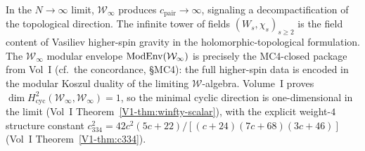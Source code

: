 \begin{remark}
In the $N \to \infty$ limit, $\mathcal{W}_\infty$ produces
$c_{\mathrm{pair}} \to \infty$, signaling a decompactification of the
topological direction. The infinite tower of fields
$(W_s, \chi_s)_{s \geq 2}$ is the field content of Vasiliev
higher-spin gravity in the holomorphic-topological formulation. The
$\mathcal{W}_\infty$ modular envelope $\operatorname{ModEnv}(\mathcal{W}_\infty)$ is
precisely the MC4-closed package from Vol~I
\textup{(}cf.~the concordance, \S\textup{MC4}\textup{)}: the full higher-spin
data is encoded in the modular Koszul duality of the limiting
$\mathcal{W}$-algebra.
Volume~I proves
$\dim H^2_{\mathrm{cyc}}(\mathcal{W}_\infty, \mathcal{W}_\infty)=1$,
so the minimal cyclic direction is one-dimensional in the limit
\textup{(}Vol~I Theorem~\ref*{V1-thm:winfty-scalar}\textup{)},
with the explicit weight-$4$ structure constant
$c_{334}^2 = 42c^2(5c+22)/[(c+24)(7c+68)(3c+46)]$
\textup{(}Vol~I Theorem~\ref*{V1-thm:c334}\textup{)}.
\end{remark}

